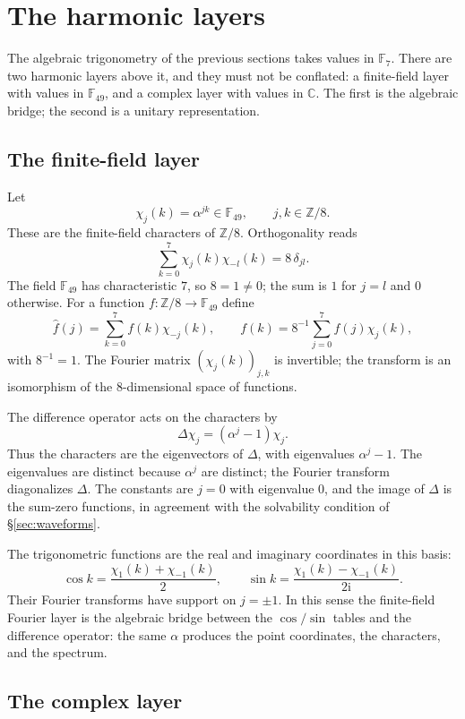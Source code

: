 \documentclass[11pt]{article}
\theoremstyle{definition}
\theoremstyle{remark}
\newcommand{\F}{\mathbb{F}}
\newcommand{\Z}{\mathbb{Z}}
\newcommand{\ii}{\mathrm{i}}
\newcommand{\C}{\mathbb{C}}
\begin{document}
\section{The harmonic layers}
\label{sec:fourier}

The algebraic trigonometry of the previous sections takes values in $\F_7$.
There are two harmonic layers above it, and they must not be conflated: a
finite-field layer with values in $\F_{49}$, and a complex layer with values in
$\C$.  The first is the algebraic bridge; the second is a unitary
representation.

\subsection{The finite-field layer}

Let
\[
  \chi_j(k)=\alpha^{jk}\in\F_{49},\qquad j,k\in\Z/8 .
\]
These are the finite-field characters of $\Z/8$.  Orthogonality reads
\[
  \sum_{k=0}^{7}\chi_j(k)\chi_{-l}(k)=8\,\delta_{jl}.
\]
The field $\F_{49}$ has characteristic $7$, so $8=1\ne0$; the sum is $1$ for
$j=l$ and $0$ otherwise.  For a function $f:\Z/8\to\F_{49}$ define
\[
  \widehat f(j)=\sum_{k=0}^{7} f(k)\chi_{-j}(k),
  \qquad
  f(k)=8^{-1}\sum_{j=0}^{7}\widehat f(j)\chi_j(k),
\]
with $8^{-1}=1$.  The Fourier matrix $(\chi_j(k))_{j,k}$ is invertible; the
transform is an isomorphism of the $8$-dimensional space of functions.

The difference operator acts on the characters by
\[
  \Delta\chi_j=(\alpha^j-1)\chi_j .
\]
Thus the characters are the eigenvectors of $\Delta$, with eigenvalues
$\alpha^j-1$.  The eigenvalues are distinct because $\alpha^j$ are distinct;
the Fourier transform diagonalizes $\Delta$.  The constants are $j=0$ with
eigenvalue $0$, and the image of $\Delta$ is the sum-zero functions, in
agreement with the solvability condition of \S\ref{sec:waveforms}.

The trigonometric functions are the real and imaginary coordinates in this
basis:
\[
  \cos k=\frac{\chi_1(k)+\chi_{-1}(k)}2,
  \qquad
  \sin k=\frac{\chi_1(k)-\chi_{-1}(k)}{2\ii}.
\]
Their Fourier transforms have support on $j=\pm1$.  In this sense the
finite-field Fourier layer is the algebraic bridge between the $\cos/\sin$
tables and the difference operator: the same $\alpha$ produces the point
coordinates, the characters, and the spectrum.

\subsection{The complex layer}
\end{document}
